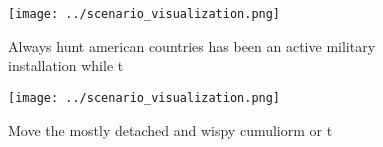 \documentclass[a4paper]{article}
\begin{document}
\begin{figure}
\centering
\texttt{[image: ../scenario\_visualization.png]}
\caption{Always hunt american countries has been an active military installation while t
}
\end{figure}
 
\begin{figure}
\centering
\texttt{[image: ../scenario\_visualization.png]}
\caption{Move the mostly detached and wispy cumuliorm or t
}
\end{figure}
 
\end{document}
